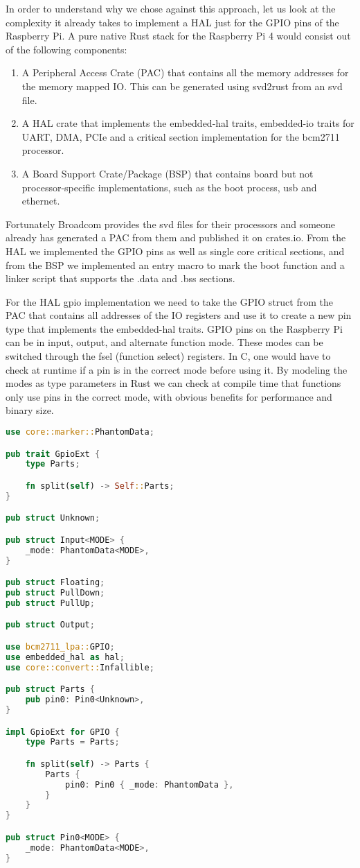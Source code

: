 In order to understand why we chose against this approach, let us look at the complexity it already takes to implement a HAL just for the GPIO pins of the Raspberry Pi.
A pure native Rust stack for the Raspberry Pi 4 would consist out of the following components:
\begin{enumerate}
    \item A Peripheral Access Crate (PAC) that contains all the memory addresses for the memory mapped IO. This can be generated using svd2rust from an svd file.
    \item A HAL crate that implements the embedded-hal traits, embedded-io traits for UART, DMA, PCIe and a critical section implementation for the bcm2711 processor.
    \item A Board Support Crate/Package (BSP) that contains board but not processor-specific implementations, such as the boot process, usb and ethernet.
\end{enumerate}

Fortunately Broadcom provides the svd files for their processors and someone already has generated a PAC from them and published it on crates.io.
From the HAL we implemented the GPIO pins as well as single core critical sections, and from the BSP we implemented an entry macro to mark the boot function and a linker script that supports the .data and .bss sections.

For the HAL gpio implementation we need to take the GPIO struct from the PAC that contains all addresses of the IO registers and use it to create a new pin type that implements the embedded-hal traits.
GPIO pins on the Raspberry Pi can be in input, output, and alternate function mode. These modes can be switched through the fsel (function select) registers.
In C, one would have to check at runtime if a pin is in the correct mode before using it.
By modeling the modes as type parameters in Rust we can check at compile time that functions only use pins in the correct mode, with obvious benefits for performance and binary size.

\begin{lstlisting}[language=Rust,style=colouredRust]
use core::marker::PhantomData;

pub trait GpioExt {
    type Parts;

    fn split(self) -> Self::Parts;
}

pub struct Unknown;

pub struct Input<MODE> {
    _mode: PhantomData<MODE>,
}

pub struct Floating;
pub struct PullDown;
pub struct PullUp;

pub struct Output;

use bcm2711_lpa::GPIO;
use embedded_hal as hal;
use core::convert::Infallible;

pub struct Parts {
    pub pin0: Pin0<Unknown>,
}

impl GpioExt for GPIO {
    type Parts = Parts;

    fn split(self) -> Parts {
        Parts {
            pin0: Pin0 { _mode: PhantomData },
        }
    }
}

pub struct Pin0<MODE> {
    _mode: PhantomData<MODE>,
}
\end{lstlisting}

